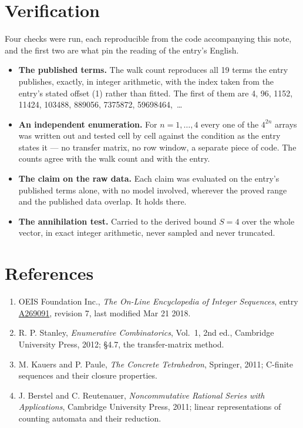 \documentclass[11pt]{article}
\theoremstyle{definition}
\begin{document}
\section{Verification}

Four checks were run, each reproducible from the code accompanying this note, and the first two are what pin the reading of the entry's English.

\begin{itemize}

\item {\bfseries The published terms.} The walk count reproduces all 19 terms the entry publishes, exactly, in integer arithmetic, with the index taken from the entry's stated offset (1) rather than fitted. The first of them are 4, 96, 1152, 11424, 103488, 889056, 7375872, 59698464,~\dots

\item {\bfseries An independent enumeration.} For $n = 1,\dots,4$ every one of the $4^{2n}$ arrays was written out and tested cell by cell against the condition as the entry states it --- no transfer matrix, no row window, a separate piece of code. The counts agree with the walk count and with the entry.

\item {\bfseries The claim on the raw data.} Each claim was evaluated on the entry's published terms alone, with no model involved, wherever the proved range and the published data overlap. It holds there.

\item {\bfseries The annihilation test.} Carried to the derived bound $S = 4$ over the whole vector, in exact integer arithmetic, never sampled and never truncated.

\end{itemize}

\section{References}

\begin{enumerate}

\item OEIS Foundation Inc., \emph{The On-Line Encyclopedia of Integer Sequences}, entry \href{https://oeis.org/A269091}{A269091}, revision 7, last modified Mar 21 2018.

\item R. P. Stanley, \emph{Enumerative Combinatorics}, Vol.~1, 2nd ed., Cambridge University Press, 2012; \S4.7, the transfer-matrix method.

\item M. Kauers and P. Paule, \emph{The Concrete Tetrahedron}, Springer, 2011; C-finite sequences and their closure properties.

\item J. Berstel and C. Reutenauer, \emph{Noncommutative Rational Series with Applications}, Cambridge University Press, 2011; linear representations of counting automata and their reduction.

\end{enumerate}
\end{document}
